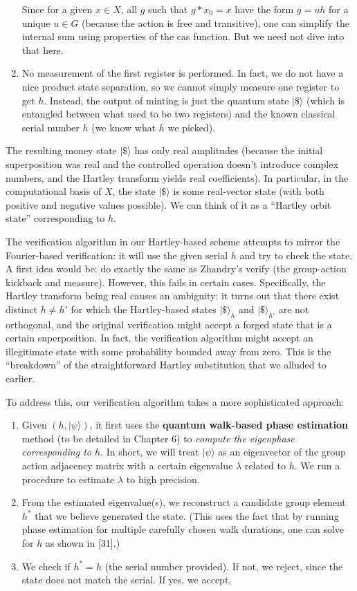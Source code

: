 \documentclass[12pt]{report}
\begin{document}
\begin{enumerate}
\[    \] 
    Since for a given $x\in X$, all $g$ such that $g*x_0=x$ have the form $g = u h$ for a unique $u \in G$ (because the action is free and transitive), one can simplify the internal sum using properties of the cas function. But we need not dive into that here.
    \item No measurement of the first register is performed. In fact, we do not have a nice product state separation, so we cannot simply measure one register to get $h$. Instead, the output of minting is just the quantum state $|\$\rangle$ (which is entangled between what used to be two registers) and the known classical serial number $h$ (we know what $h$ we picked).
\end{enumerate}

The resulting money state $|\$\rangle$ has only real amplitudes (because the initial superposition was real and the controlled operation doesn’t introduce complex numbers, and the Hartley transform yields real coefficients). In particular, in the computational basis of $X$, the state $|\$\rangle$ is some real-vector state (with both positive and negative values possible). We can think of it as a “Hartley orbit state” corresponding to $h$.

The verification algorithm in our Hartley-based scheme attempts to mirror the Fourier-based verification: it will use the given serial $h$ and try to check the state. A first idea would be: do exactly the same as Zhandry’s verify (the group-action kickback and measure). However, this fails in certain cases. Specifically, the Hartley transform being real causes an ambiguity: it turns out that there exist distinct $h \neq h'$ for which the Hartley-based states $|\$\rangle_h$ and $|\$\rangle_{h'}$ are not orthogonal, and the original verification might accept a forged state that is a certain superposition. In fact, the verification algorithm might accept an illegitimate state with some probability bounded away from zero. This is the “breakdown” of the straightforward Hartley substitution that we alluded to earlier.

To address this, our verification algorithm takes a more sophisticated approach:
\begin{enumerate}
    \item Given $(h, |\psi\rangle)$, it first uses the \textbf{quantum walk-based phase estimation} method (to be detailed in Chapter 6) to \emph{compute the eigenphase corresponding to $h$}. In short, we will treat $|\psi\rangle$ as an eigenvector of the group action adjacency matrix with a certain eigenvalue $\lambda$ related to $h$. We run a procedure to estimate $\lambda$ to high precision.
    \item From the estimated eigenvalue(s), we reconstruct a candidate group element $h^*$ that we believe generated the state. (This uses the fact that by running phase estimation for multiple carefully chosen walk durations, one can solve for $h$ as shown in [31].)
    \item We check if $h^* = h$ (the serial number provided). If not, we reject, since the state does not match the serial. If yes, we accept.
\end{enumerate}
\end{document}

